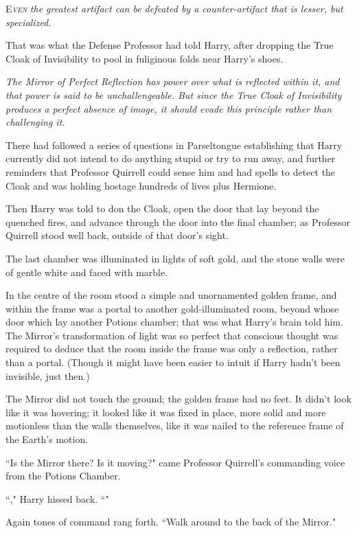 
\lettrine{E}{\emph{ven}}\emph{ the greatest artifact can be defeated by a counter-artifact that is lesser, but specialized.}

That was what the Defense Professor had told Harry, after dropping the True Cloak of Invisibility to pool in fuliginous folds near Harry's shoes.

\emph{The Mirror of Perfect Reflection has power over what is reflected within it, and that power is said to be unchallengeable. But since the True Cloak of Invisibility produces a perfect absence of image, it should evade this principle rather than challenging it.}

There had followed a series of questions in Parseltongue establishing that Harry currently did not intend to do anything stupid or try to run away, and further reminders that Professor Quirrell could sense him and had spells to detect the Cloak and was holding hostage hundreds of lives plus Hermione.

Then Harry was told to don the Cloak, open the door that lay beyond the quenched fires, and advance through the door into the final chamber; as Professor Quirrell stood well back, outside of that door's sight.

The last chamber was illuminated in lights of soft gold, and the stone walls were of gentle white and faced with marble.

In the centre of the room stood a simple and unornamented golden frame, and within the frame was a portal to another gold-illuminated room, beyond whose door which lay another Potions chamber; that was what Harry's brain told him. The Mirror's transformation of light was so perfect that conscious thought was required to deduce that the room inside the frame was only a reflection, rather than a portal. (Though it might have been easier to intuit if Harry hadn't been invisible, just then.)

The Mirror did not touch the ground; the golden frame had no feet. It didn't look like it was hovering; it looked like it was fixed in place, more solid and more motionless than the walls themselves, like it was nailed to the reference frame of the Earth's motion.

``Is the Mirror there? Is it moving?" came Professor Quirrell's commanding voice from the Potions Chamber.

``," Harry hissed back. ``"

Again tones of command rang forth. ``Walk around to the back of the Mirror."

